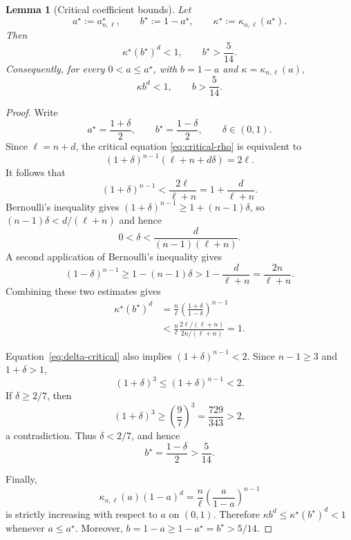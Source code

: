 \documentclass[11pt]{article}
\newtheorem{lemma}[theorem]{Lemma}
\theoremstyle{definition}
\theoremstyle{remark}
\begin{document}
\begin{lemma}[Critical coefficient bounds]
  Let
  \[
    a^\star:=a_{n,\ell}^{\star},
    \qquad b^\star:=1-a^\star,
    \qquad \kappa^\star:=\kappa_{n,\ell}(a^\star).
  \]
  Then
  \[
    \kappa^\star(b^\star)^d<1,
    \qquad
    b^\star>\frac5{14}.
  \]
  Consequently, for every $0<a\le a^\star$, with $b=1-a$ and
  $\kappa=\kappa_{n,\ell}(a)$,
  \begin{equation}
    \kappa b^d<1,
    \qquad
    b>\frac5{14}.
    \label{eq:all-kappa-bounds}
  \end{equation}
\end{lemma}

\begin{proof}
  Write
  \[
    a^\star=\frac{1+\delta}{2},
    \qquad
    b^\star=\frac{1-\delta}{2},
    \qquad
    \delta\in(0,1).
  \]
  Since $\ell=n+d$, the critical equation
  \eqref{eq:critical-rho} is equivalent to
  \begin{equation}
    (1+\delta)^{n-1}(\ell+n+d\delta)=2\ell.
    \label{eq:delta-critical}
  \end{equation}
  It follows that
  \[
    (1+\delta)^{n-1}
    <\frac{2\ell}{\ell+n}
    =1+\frac{d}{\ell+n}.
  \]
  Bernoulli's inequality gives $(1+\delta)^{n-1}\ge1+(n-1)\delta$, so
  $(n-1)\delta<d/(\ell+n)$ and hence
  \[
    0<\delta<\frac{d}{(n-1)(\ell+n)}.
  \]
  A second application of Bernoulli's inequality gives
  \[
    (1-\delta)^{n-1}
    \ge1-(n-1)\delta
    >1-\frac{d}{\ell+n}
    =\frac{2n}{\ell+n}.
  \]
  Combining these two estimates gives
  \begin{align*}
    \kappa^\star(b^\star)^d
    &=\frac n\ell
      \left(\frac{1+\delta}{1-\delta}\right)^{n-1}\\
    &<\frac n\ell
      \frac{2\ell/(\ell+n)}{2n/(\ell+n)}
    =1.
  \end{align*}

  Equation~\eqref{eq:delta-critical} also implies
  $(1+\delta)^{n-1}<2$.  Since $n-1\ge3$ and $1+\delta>1$,
  \[
    (1+\delta)^3\le(1+\delta)^{n-1}<2.
  \]
  If $\delta\ge2/7$, then
  \[
    (1+\delta)^3\ge\left(\frac97\right)^3
    =\frac{729}{343}>2,
  \]
  a contradiction.  Thus $\delta<2/7$, and hence
  \[
    b^\star=\frac{1-\delta}{2}>\frac5{14}.
  \]

  Finally,
  \[
    \kappa_{n,\ell}(a)(1-a)^d
    =\frac n\ell
      \left(\frac{a}{1-a}\right)^{n-1}
  \]
  is strictly increasing with respect to $a$ on $(0,1)$.  Therefore
  $\kappa b^d\le\kappa^\star(b^\star)^d<1$ whenever
  $a\le a^\star$.  Moreover,
  $b=1-a\ge1-a^\star=b^\star>5/14$.
\end{proof}
\end{document}
